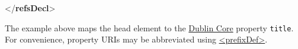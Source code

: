 \begin{shaded}
\hspace*{1em}\hspace*{1em}\hspace*{1em}\mbox{}\newline 
\hspace*{1em}\hspace*{1em}\mbox{}\newline 
\hspace*{1em}\mbox{}\newline 
{}\mbox{}\newline 
{</\textbf{refsDecl}>}\end{shaded}\egroup\par \noindent  The example above maps the head element to the \hyperref[CO-BIBL-2]{Dublin Core} property \texttt{title}. For convenience, property URIs may be abbreviated using \hyperref[TEI.prefixDef]{<prefixDef>}.\par
